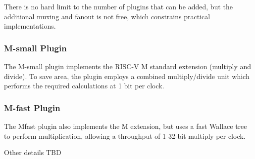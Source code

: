 There is no hard limit to the number of plugins that can be added, but the additional muxing and fanout is not free, which constrains practical implementations.

\subsubsection{M-small Plugin}

The M-small plugin implements the RISC-V M standard extension (multiply and divide). To save area, the plugin employs a combined multiply/divide unit which performs the required calculations at 1 bit per clock.

\subsubsection{M-fast Plugin}

The Mfast plugin also implements the M extension, but uses a fast Wallace tree to perform multiplication, allowing a throughput of 1 32-bit multiply per clock.

Other details TBD
